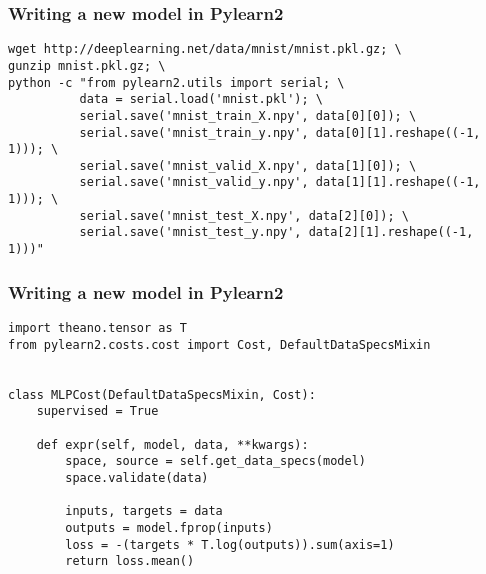 \documentclass[mathserif, xcolor=dvipsnames]{beamer}
\begin{document}
\begin{frame}[fragile]
    \frametitle{Writing a new model in Pylearn2}
    \begin{examples}
\begin{lstlisting}[caption=Format the data for Pylearn2]
wget http://deeplearning.net/data/mnist/mnist.pkl.gz; \
gunzip mnist.pkl.gz; \
python -c "from pylearn2.utils import serial; \
          data = serial.load('mnist.pkl'); \
          serial.save('mnist_train_X.npy', data[0][0]); \
          serial.save('mnist_train_y.npy', data[0][1].reshape((-1, 1))); \
          serial.save('mnist_valid_X.npy', data[1][0]); \
          serial.save('mnist_valid_y.npy', data[1][1].reshape((-1, 1))); \
          serial.save('mnist_test_X.npy', data[2][0]); \
          serial.save('mnist_test_y.npy', data[2][1].reshape((-1, 1)))"
\end{lstlisting}
    \end{examples}
\end{frame}

\begin{frame}[fragile]
    \frametitle{Writing a new model in Pylearn2}
    \begin{examples}
\begin{lstlisting}[caption=Cost implementation for MLP]
import theano.tensor as T
from pylearn2.costs.cost import Cost, DefaultDataSpecsMixin


class MLPCost(DefaultDataSpecsMixin, Cost):
    supervised = True

    def expr(self, model, data, **kwargs):
        space, source = self.get_data_specs(model)
        space.validate(data)

        inputs, targets = data
        outputs = model.fprop(inputs)
        loss = -(targets * T.log(outputs)).sum(axis=1)
        return loss.mean()
\end{lstlisting}
    \end{examples}
\end{frame}
\end{document}

